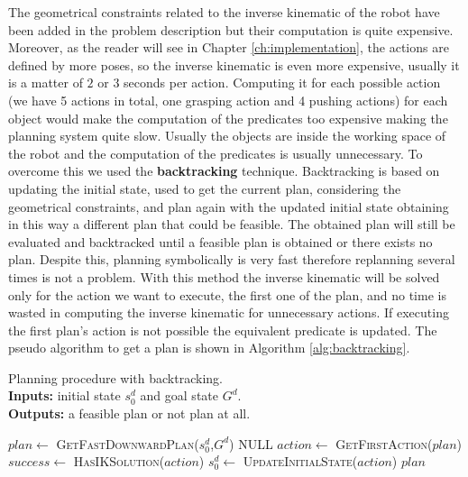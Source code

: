 The geometrical constraints related to the inverse kinematic of the robot have been added in the problem description but their computation is quite expensive. Moreover, as the reader will see in Chapter \ref{ch:implementation}, the actions are defined by more poses, so the inverse kinematic is even more expensive, usually it is a matter of $2$ or $3$ seconds per action. Computing it for each possible action (we have 5 actions in total, one grasping action and 4 pushing actions) for each object would make the computation of the predicates too expensive making the planning system quite slow. Usually the objects are inside the working space of the robot and the computation of the  predicates is usually unnecessary. To overcome this we used the \textbf{backtracking} technique\citep{Bidot2015}. Backtracking is based on updating the initial state, used to get the current plan, considering the geometrical constraints, and plan again with the updated initial state obtaining in this way a different plan that could be feasible. The obtained plan will still be evaluated and backtracked until a feasible plan is obtained or there exists no plan. Despite this, planning symbolically is very fast therefore replanning several times is not a problem. With this method the inverse kinematic will be solved only for the action we want to execute, the first one of the plan, and no time is wasted in computing the inverse kinematic for unnecessary actions. If executing the first plan's action is not possible the equivalent  predicate is updated. The pseudo algorithm to get a plan is shown in Algorithm \ref{alg:backtracking}.

\begin{algorithm}
\caption{Planning procedure with backtracking.\\
\textbf{Inputs:} initial state $s_{0}^d$ and goal state $G^d$. \\
\textbf{Outputs:} a feasible plan or not plan at all. }\label{alg:backtracking}
\begin{algorithmic}
\Repeat
  \State $plan \gets$ \textsc{GetFastDownwardPlan}($s_{0}^d$,$G^d$)
  		\Return NULL 
  \EndIf
  \State $action\gets$ \textsc{GetFirstAction}($plan$)
  \State $success \gets$ \textsc{HasIKSolution}($action$) 
    \State $s_{0}^d \gets$ \textsc{UpdateInitialState}($action$) 
  \EndIf
{}
\Return $plan$
\EndProcedure
\end{algorithmic}
\end{algorithm}  

